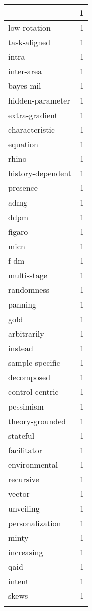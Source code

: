 \begin{table}[h]
\begin{tabular}{|l|r|}
{\hline
self-correct & 1 \\
\hline
low-rotation & 1 \\
\hline
task-aligned & 1 \\
\hline
intra & 1 \\
\hline
inter-area & 1 \\
\hline
bayes-mil & 1 \\
\hline
hidden-parameter & 1 \\
\hline
extra-gradient & 1 \\
\hline
characteristic & 1 \\
\hline
equation & 1 \\
\hline
rhino & 1 \\
\hline
history-dependent & 1 \\
\hline
presence & 1 \\
\hline
admg & 1 \\
\hline
ddpm & 1 \\
\hline
figaro & 1 \\
\hline
micn & 1 \\
\hline
f-dm & 1 \\
\hline
multi-stage & 1 \\
\hline
randomness & 1 \\
\hline
panning & 1 \\
\hline
gold & 1 \\
\hline
arbitrarily & 1 \\
\hline
instead & 1 \\
\hline
sample-specific & 1 \\
\hline
decomposed & 1 \\
\hline
control-centric & 1 \\
\hline
pessimism & 1 \\
\hline
theory-grounded & 1 \\
\hline
stateful & 1 \\
\hline
facilitator & 1 \\
\hline
environmental & 1 \\
\hline
recursive & 1 \\
\hline
vector & 1 \\
\hline
unveiling & 1 \\
\hline
personalization & 1 \\
\hline
minty & 1 \\
\hline
increasing & 1 \\
\hline
qaid & 1 \\
\hline
intent & 1 \\
\hline
skews & 1 \\
}
\end{tabular}
\end{table}
